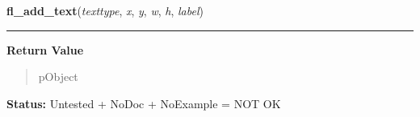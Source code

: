     \label{xformslib:library:fl_add_text}

    \vspace{0.5ex}

\hspace{.8\funcindent}\begin{boxedminipage}{\funcwidth}

    \raggedright \textbf{fl\_add\_text}(\textit{texttype}, \textit{x}, \textit{y}, \textit{w}, \textit{h}, \textit{label})

    \vspace{-1.5ex}

    \rule{\textwidth}{0.5\fboxrule}
\setlength{\parskip}{2ex}
\setlength{\parskip}{1ex}
      \textbf{Return Value}
    \vspace{-1ex}

      \begin{quote}
      pObject

      \end{quote}

\textbf{Status:} Untested + NoDoc + NoExample = NOT OK



    \end{boxedminipage}

    \label{xformslib:library:fl_get_thumbwheel_value}

    \vspace{0.5ex}

